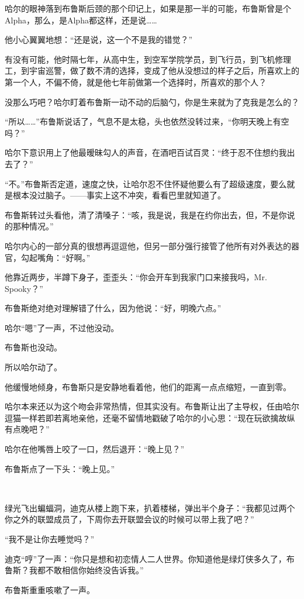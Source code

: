\documentclass[../main]{subfiles}
\begin{document}
哈尔的眼神落到布鲁斯后颈的那个印记上，如果是那一半的可能，布鲁斯曾是个Alpha，那么，是Alpha都这样，还是说……

他小心翼翼地想：“还是说，这一个不是我的错觉？”

有没有可能，他时隔七年，从高中生，到空军学院学员，到飞行员，到飞机修理工，到宇宙巡警，做了数不清的选择，变成了他从没想过的样子之后，所喜欢上的第一个人，不偏不倚，就是他七年前做第一个选择时，所喜欢的那个人？

没那么巧吧？哈尔盯着布鲁斯一动不动的后脑勺，你是生来就为了克我是怎么的？

“所以……”布鲁斯说话了，气息不是太稳，头也依然没转过来，“你明天晚上有空吗？”

哈尔下意识用上了他最暧昧勾人的声音，在酒吧百试百灵：“终于忍不住想约我出去了？”

“不。”布鲁斯否定道，速度之快，让哈尔忍不住怀疑他要么有了超级速度，要么就是根本没过脑子。——事实上这不冲突，看看巴里就知道了。

布鲁斯转过头看他，清了清嗓子：“咳，我是说，我是在约你出去，但，不是你说的那种情况。”

哈尔内心的一部分真的很想再逗逗他，但另一部分强行接管了他所有对外表达的器官，勾起嘴角：“好啊。”

他靠近两步，半蹲下身子，歪歪头：“你会开车到我家门口来接我吗，Mr.
Spooky？”

布鲁斯绝对绝对理解错了什么，因为他说：“好，明晚六点。”

哈尔“嗯”了一声，不过他没动。

布鲁斯也没动。

所以哈尔动了。

他缓慢地倾身，布鲁斯只是安静地看着他，他们的距离一点点缩短，一直到零。

哈尔本来还以为这个吻会非常热情，但其实没有。布鲁斯让出了主导权，任由哈尔逗猫一样若即若离地亲他，还毫不留情地戳破了哈尔的小心思：“现在玩欲擒故纵有点晚吧？”

哈尔在他嘴唇上咬了一口，然后退开：“晚上见？”

布鲁斯点了一下头：“晚上见。”

~\

绿光飞出蝙蝠洞，迪克从楼上跑下来，扒着楼梯，弹出半个身子：“我都见过两个你之外的联盟成员了，下周你去开联盟会议的时候可以带上我了吧？”

“我不是让你去睡觉吗？”

迪克“哼”了一声：“你只是想和初恋情人二人世界。你知道他是绿灯侠多久了，布鲁斯？我都不敢相信你始终没告诉我。”

布鲁斯重重咳嗽了一声。
\end{document}
